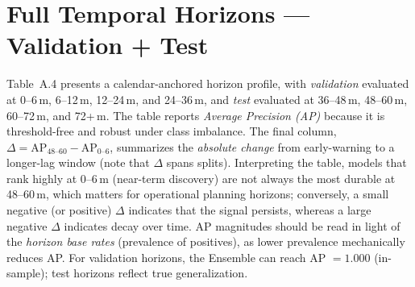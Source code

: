 \section{Full Temporal Horizons --- Validation + Test}
\label{app:a4-temporal}
\noindent
Table~A.4 presents a calendar-anchored horizon profile, with \textit{validation} evaluated at 0--6\,m, 6--12\,m, 12--24\,m, and 24--36\,m, and \textit{test} evaluated at 36--48\,m, 48--60\,m, 60--72\,m, and 72+\,m. The table reports \emph{Average Precision (AP)} because it is threshold-free and robust under class imbalance. The final column, \(\Delta=\mathrm{AP}_{48\text{--}60}-\mathrm{AP}_{0\text{--}6}\), summarizes the \emph{absolute change} from early-warning to a longer-lag window (note that \(\Delta\) spans splits). Interpreting the table, models that rank highly at 0--6\,m (near-term discovery) are not always the most durable at 48--60\,m, which matters for operational planning horizons; conversely, a small negative (or positive) \(\Delta\) indicates that the signal persists, whereas a large negative \(\Delta\) indicates decay over time. AP magnitudes should be read in light of the \emph{horizon base rates} (prevalence of positives), as lower prevalence mechanically reduces AP. For validation horizons, the Ensemble can reach AP \(=1.000\) (in-sample); test horizons reflect true generalization.


